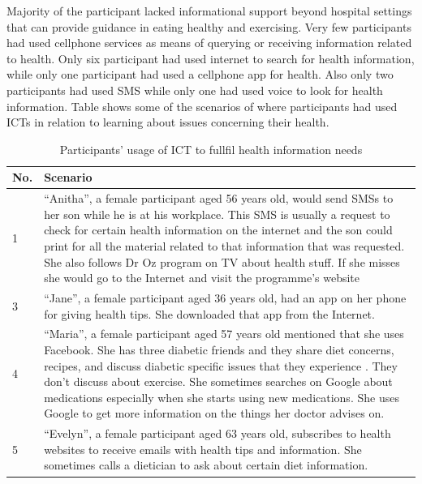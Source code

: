 Majority of the participant lacked informational support beyond hospital settings that can provide guidance in eating healthy and exercising. Very few participants had used cellphone services as means of querying or receiving information related to health. Only six participant had used internet to search for health information, while only one participant had used a cellphone app for health. Also only two participants had used SMS while only one had used voice to look for health information. Table shows some of the scenarios of where participants had used ICTs in relation to learning about issues concerning their health.
\begin{table}[h!]
\begin{center}
    \caption{Participants’ usage of ICT to fullfil health information needs}
    \label{table:health_information}
	\begin{tabular}{|p{1cm}|p{12cm}|}
		\hline
		 \textbf{No.}&\textbf{Scenario}\\
		 \hline
		 1&``Anitha'', a female participant aged 56 years old, would send SMSs to her son while he is at his workplace. This SMS is usually a request to check for certain  health information on the internet and the son could print for all the material related to that information that was requested. She also follows Dr Oz program on TV about health stuff. If she misses she would go to the Internet and visit the programme's website\\
	  \hline
	  3& ``Jane'', a female participant aged 36 years old, had an app on her phone for giving health tips. She downloaded that app from the Internet.\\
	  \hline
	  4& ``Maria'', a female participant aged 57 years old mentioned that she uses Facebook. She has three diabetic friends and they share diet concerns, recipes, and discuss diabetic specific issues that they experience . They don't discuss about exercise. She sometimes searches on Google about medications especially when she starts using new medications. She uses Google to get more information on the things her doctor advises on.\\
	  \hline
	  5& ``Evelyn'', a female participant aged 63 years old, subscribes to health websites to receive emails with health tips and information. She sometimes calls a dietician to ask about certain diet information.\\
	  \hline
	\end{tabular}
  \end{center}
\end{table}

